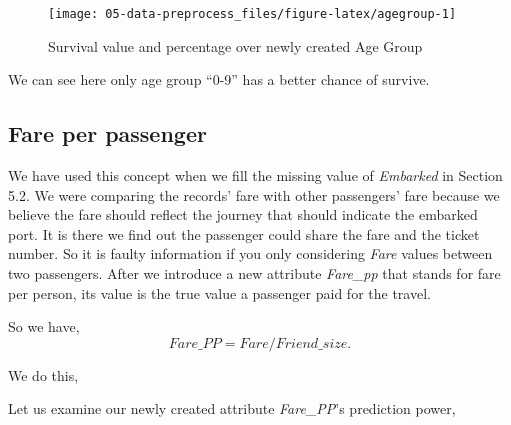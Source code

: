 \documentclass[
]{book}
\newenvironment{Shaded}{\begin{snugshade}}{\end{snugshade}}
\newcommand{\NormalTok}[1]{#1}
\newcommand{\OperatorTok}[1]{\textcolor[rgb]{0.81,0.36,0.00}{\textbf{#1}}}
\newcommand{\StringTok}[1]{\textcolor[rgb]{0.31,0.60,0.02}{#1}}
\begin{document}
\begin{figure}

{\centering \texttt{[image: 05-data-preprocess\_files/figure-latex/agegroup-1]} 

}

\caption{Survival value and percentage over newly created Age Group}\label{fig:agegroup}
\end{figure}

We can see here only age group ``0-9'' has a better chance of survive.

\hypertarget{farepp}{%
\subsection*{Fare per passenger}\label{farepp}}


We have used this concept when we fill the missing value of \emph{Embarked} in Section 5.2. We were comparing the records' fare with other passengers' fare because we believe the fare should reflect the journey that should indicate the embarked port. It is there we find out the passenger could share the fare and the ticket number. So it is faulty information if you only considering \emph{Fare} values between two passengers. After we introduce a new attribute \emph{Fare\_pp} that stands for fare per person, its value is the true value a passenger paid for the travel.

So we have,
\begin{equation} 
Fare\_PP = Fare / Friend\_size.
\label{eq:farepp}
\end{equation}

We do this,

\begin{Shaded}
\end{Shaded}

Let us examine our newly created attribute \emph{Fare\_PP}'s prediction power,
\end{document}
